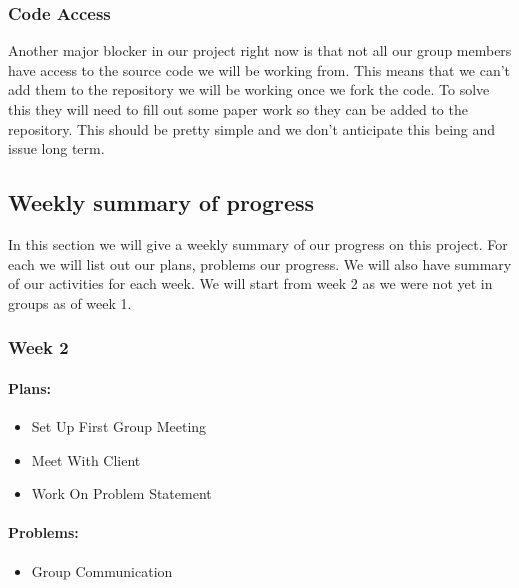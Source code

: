 \documentclass[onecolumn, draftclsnofoot,10pt, compsoc]{article}
\begin{document}
	    
	    \subsubsection{Code Access}
	        Another major blocker in our project right now is that not all our group members have access to the source code we will be working from. This means that we can't add them to the repository we will be working once we fork the code. To solve this they will need to fill out some paper work so they can be added to the repository. This should be pretty simple and we don't anticipate this being and issue long term.\\
	
	\subsection{Weekly summary of progress}
	    In this section we will give a weekly summary of our progress on this project. For each we will list out our plans, problems our progress. We will also have summary of our activities for each week. We will start from week 2 as we were not yet in groups as of week 1.\\
		
		\subsubsection{Week 2}
		
		    \paragraph{Plans:} \hfill \break
		    
		    \begin{itemize}
		        \item Set Up First Group Meeting
		        \item Meet With Client
		        \item Work On Problem Statement
		    \end{itemize}
		
		    \paragraph{Problems:} \hfill \break
		    
		    \begin{itemize}
		        \item Group Communication 
		    \end{itemize}
		    
\end{document}
